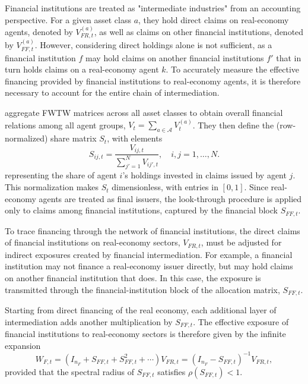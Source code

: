 Financial institutions are treated as "intermediate industries" from an accounting perspective. For a given asset class $a$, they hold direct claims on real-economy agents, denoted by $V_{FR,t}^{(a)}$, as well as claims on other financial institutions, denoted by $V_{FF,t}^{(a)}$. However, considering direct holdings alone is not sufficient, as a financial institution $f$ may hold claims on another financial institutions $f'$ that in turn holds claims on a real-economy agent $k$. To accurately measure the effective financing provided by financial institutions to real-economy agents, it is therefore necessary to account for the entire chain of intermediation.

\textcite{jondeau_environmental_2026} aggregate FWTW matrices across all asset classes to obtain overall financial relations among all agent groups, $V_t = \sum_{a \in \mathcal{A}} V_t^{(a)}$. They then define the (row-normalized) share matrix $S_t$, with elements
\begin{equation}
S_{ij,t} = \frac{V_{ij,t}}{\sum_{j'=1}^{N} V_{ij',t}}, \quad i,j = 1,\ldots,N.
\end{equation}
representing the share of agent $i$'s holdings invested in claims issued by agent $j$. This normalization makes $S_t$ dimensionless, with entries in $[0,1]$. Since real-economy agents are treated as final issuers, the look-through procedure is applied only to claims among financial institutions, captured by the financial block $S_{FF,t}$.

To trace financing through the network of financial institutions, the direct claims of financial institutions on real-economy sectors, $V_{FR,t}$, must be adjusted for indirect exposures created by financial intermediation. For example, a financial institution may not finance a real-economy issuer directly, but may hold claims on another financial institution that does. In this case, the exposure is transmitted through the financial-institution block of the allocation matrix, $S_{FF,t}$.

Starting from direct financing of the real economy, each additional layer of intermediation adds another multiplication by $S_{FF,t}$. The effective exposure of financial institutions to real-economy sectors is therefore given by the infinite expansion
\begin{equation}
W_{F,t}
= \left(I_{n_F} + S_{FF,t} + S_{FF,t}^2 + \cdots \right)V_{FR,t}
= (I_{n_F} - S_{FF,t})^{-1}V_{FR,t},
\label{eq:effective_exposure}
\end{equation}
provided that the spectral radius of $S_{FF,t}$ satisfies $\rho(S_{FF,t}) < 1$.

